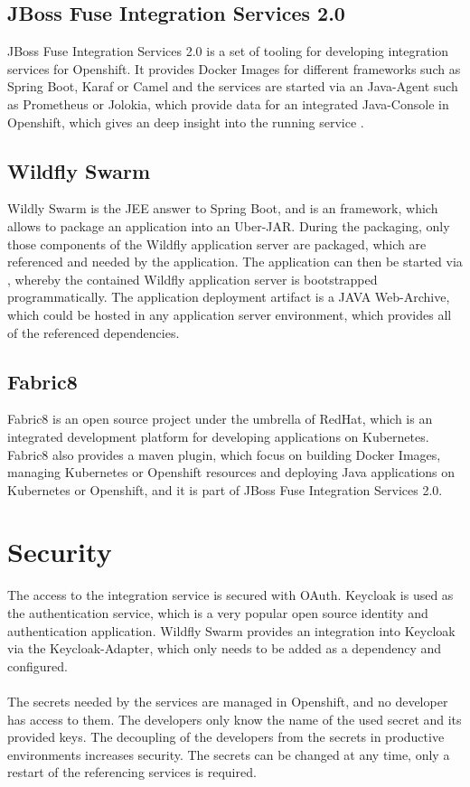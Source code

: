 \subsection{JBoss Fuse Integration Services 2.0}
\label{sec:esbi-technology-fis}
JBoss Fuse Integration Services 2.0 is a set of tooling for developing integration services for Openshift. It provides Docker Images for different frameworks such as Spring Boot, Karaf or Camel and the services are started via an Java-Agent such as Prometheus or Jolokia, which provide data for an integrated Java-Console in Openshift, which gives an deep insight into the running service \cite{Prometheus2018, Jolokia2018}.

\subsection{Wildfly Swarm}
\label{sec:esbi-technology-swarm}
Wildly Swarm is the JEE answer to Spring Boot, and is an framework, which allows to package an application into an Uber-JAR. During the packaging, only those components of the Wildfly application server are packaged, which are referenced and needed by the application. The application can then be started via , whereby the contained Wildfly application server is bootstrapped programmatically.  The application deployment artifact is a JAVA Web-Archive, which could be hosted in any application server environment, which provides all of the referenced dependencies. 

\subsection{Fabric8}
\label{sec:esbi-technology-f8}
Fabric8 is an open source project under the umbrella of RedHat, which is an integrated development platform for developing applications on Kubernetes. Fabric8 also provides a maven plugin, which focus on building Docker Images, managing Kubernetes or Openshift resources and deploying Java applications on Kubernetes or Openshift, and it is part of JBoss Fuse Integration Services 2.0.

\section{Security}
\label{sec:esbi-security}
The access to the integration service is secured with OAuth. Keycloak is used as the authentication service, which is a very popular open source identity and authentication application. Wildfly Swarm provides an integration into Keycloak via the Keycloak-Adapter, which only needs to be added as a dependency and configured.
\\ \\
The secrets needed by the services are managed in Openshift, and no developer has access to them. The developers only know the name of the used secret and its provided keys. The decoupling of the developers from the secrets in productive environments increases security. The secrets can be changed at any time, only a restart of the referencing services is required.

